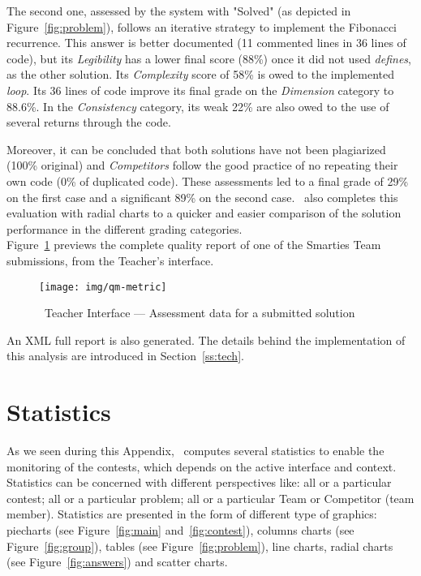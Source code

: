 The second one, assessed by the system with "Solved" (as depicted in Figure~\ref{fig:problem}), follows an iterative strategy to implement the Fibonacci recurrence. 
This answer is better documented (11 commented lines in 36 lines of code), but its \emph{Legibility} has a lower final score (88\%) once it did not used \emph{defines}, as the other solution.
Its \emph{Complexity} score of 58\% is owed to the implemented \emph{loop}.
Its 36 lines of code improve its final grade on the \emph{Dimension} category to 88.6\%.
In the \emph{Consistency} category, its weak 22\% are also owed to the use of several returns through the code.

Moreover, it can be concluded that both solutions have not been plagiarized (100\% original) and \emph{Competitors} follow the good practice of no repeating their own code (0\% of duplicated code).
These assessments led to a final grade of 29\% on the first case and a significant 89\% on the second case.
\quim\ also completes this evaluation with radial charts to a quicker and easier comparison of the solution performance in the different grading categories.
\\

Figure~\ref{fig:metrics} previews the complete quality report of one of the \textsf{Smarties} Team submissions, from the \textsf{Teacher}'s interface. 

\begin{figure}[h]
\begin{center}
\texttt{[image: img/qm-metric]}
\caption{\quim\ \textsf{Teacher} Interface ---  Assessment data for a submitted solution}\label{fig:metrics}
\end{center}
\end{figure}

\newpage
An XML full report is also generated.
The details behind the implementation of this analysis are introduced in Section~\ref{ss:tech}.

\section{Statistics}\label{s:stats}

As we seen during this Appendix, \quim\ computes several statistics to enable the monitoring of the contests, which depends on the active interface and context. Statistics can be concerned with different  perspectives
like:
all or a  particular contest;
all or a particular  problem;
all or a particular Team or Competitor (team member).
Statistics are presented in the form of different type of graphics: piecharts (see Figure~\ref{fig:main} and~\ref{fig:contest}), columns charts (see Figure~\ref{fig:group}), tables (see Figure~\ref{fig:problem}), line charts, radial charts (see Figure~\ref{fig:answers}) and scatter charts. 

